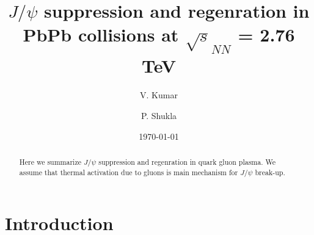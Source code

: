 \documentclass[aps,prc,preprint,superscriptaddress,showpacs,showkeys]{revtex4-1}
\begin{document}

\title{{\Large $J/\psi$ suppression and regenration in PbPb collisions at $\sqrt s_{NN}$ =  2.76 TeV }}

\author{\large V. Kumar}
\author{\large P. Shukla}

\date{\today}


\begin{abstract}

Here we summarize $J/\psi$ suppression and regenration in quark gluon plasma. 
We assume that thermal activation due to gluons is main mechanism for $J/\psi$
break-up.
 

\end{abstract}




\maketitle


\section{Introduction}

\end{document}
